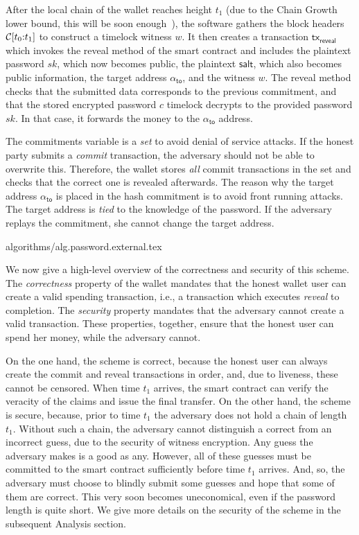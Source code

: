 After the local chain of the wallet reaches height $t_1$ (due to the Chain Growth lower bound, this
will be soon enough~\cite{backbone}), the software gathers the block headers
$\mathcal{C}[t_0{:}t_1]$ to construct a timelock witness $w$. It then creates a transaction
$\textsf{tx}_\textsf{reveal}$ which invokes the \textsf{reveal} method of the smart contract
and includes the plaintext password $sk$, which now becomes public, the plaintext
$\textsf{salt}$, which also becomes public information, the target address $\alpha_{\textsf{to}}$, and
the witness $w$. The \textsf{reveal} method checks that the submitted data corresponds to the
previous commitment, and that the stored encrypted password $c$ timelock decrypts to the provided
password $sk$. In that case, it forwards the money to the $\alpha_{\textsf{to}}$ address.

The \textsf{commitments} variable is a \emph{set} to avoid denial of service attacks.
If the honest party submits a \emph{commit} transaction, the adversary should not be
able to overwrite this. Therefore, the wallet stores \emph{all} commit transactions in
the set and checks that the correct one is revealed afterwards. The reason why the
target address $\alpha_\textsf{to}$ is placed in the hash commitment is to avoid front
running attacks. The target address is \emph{tied} to the knowledge of the password.
If the adversary replays the commitment, she cannot change the target address.

{algorithms/alg.password.external.tex}

We now give a high-level overview of the correctness and security of this scheme.
The \emph{correctness} property of the wallet mandates that the honest wallet user can
create a valid spending transaction, i.e., a transaction which executes
\emph{reveal} to completion. The \emph{security} property mandates that the adversary
cannot create a valid transaction. These properties, together, ensure that the honest user
can spend her money, while the adversary cannot.

On the one hand, the scheme is correct, because the honest user can always create the commit
and reveal transactions in order, and, due to liveness, these cannot be censored. When time
$t_1$ arrives, the smart contract can verify the veracity of the claims and issue the final
transfer. On the other hand, the scheme is secure, because, prior to time $t_1$ the adversary
does not hold a chain of length $t_1$. Without such a chain, the adversary cannot distinguish
a correct from an incorrect guess, due to the security of witness encryption. Any guess the
adversary makes is a good as any. However, all of these guesses must be committed to the smart
contract sufficiently before time $t_1$ arrives. And, so, the adversary must choose to blindly
submit some guesses and hope that some of them are correct. This very soon becomes uneconomical,
even if the password length is quite short. We give more details on the security of the scheme
in the subsequent Analysis section.

